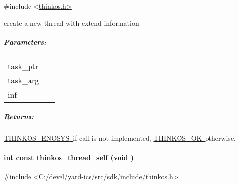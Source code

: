 {}

{\#include
\textless{}}{\protect\hyperlink{h.pkwqa1}{thinkos.h}}{\protect\hyperlink{h.pkwqa1}{\textgreater{}}}

{create a new thread with extend information }

{}

\subparagraph{\texorpdfstring{{Parameters:}}{Parameters:}}\label{parameters-1}

\protect\hypertarget{t.4f5f8686134758035dc5df693ca2b3c02acdada7}{}{}\protect\hypertarget{t.1}{}{}

\begin{longtable}[]{@{}ll@{}}
\toprule
\begin{minipage}[t]{0.47\columnwidth}\raggedright\strut
{task\_ptr}{~}\strut
\end{minipage} & \begin{minipage}[t]{0.47\columnwidth}\raggedright\strut
{}\strut
\end{minipage}\tabularnewline
\begin{minipage}[t]{0.47\columnwidth}\raggedright\strut
{task\_arg}{~}\strut
\end{minipage} & \begin{minipage}[t]{0.47\columnwidth}\raggedright\strut
{}\strut
\end{minipage}\tabularnewline
\begin{minipage}[t]{0.47\columnwidth}\raggedright\strut
{inf}{~}\strut
\end{minipage} & \begin{minipage}[t]{0.47\columnwidth}\raggedright\strut
{}\strut
\end{minipage}\tabularnewline
\bottomrule
\end{longtable}

\subparagraph{\texorpdfstring{{Returns:}}{Returns:}}\label{returns-1}

{\protect\hyperlink{h.3s49zyc}{THINKOS\_ENOSYS}}{\protect\hyperlink{h.3s49zyc}{~}}{if
call is not implemented,
}{\protect\hyperlink{h.2fk6b3p}{THINKOS\_OK}}{\protect\hyperlink{h.2fk6b3p}{~}}{otherwise.
}

\paragraph{\texorpdfstring{{int const thinkos\_thread\_self (void
)}}{int const thinkos\_thread\_self (void )}}\label{int-const-thinkos_thread_self-void}

{}

{\#include
\textless{}}{\protect\hyperlink{h.pkwqa1}{C:/devel/yard-ice/src/sdk/include/thinkos.h}}{\protect\hyperlink{h.pkwqa1}{\textgreater{}}}


